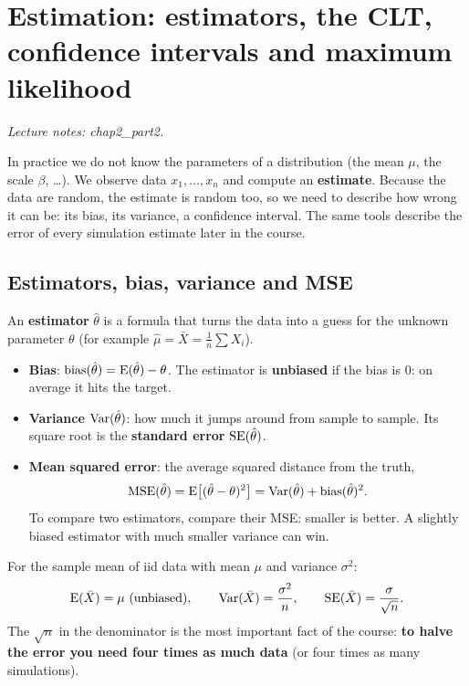 \section{Estimation: estimators, the CLT, confidence intervals and maximum likelihood}
\textit{Lecture notes: chap2\_part2.}

\begin{idea}
In practice we do not know the parameters of a distribution (the mean $\mu$, the scale $\beta$, \ldots). We observe data $x_1,\dots,x_n$ and compute an \textbf{estimate}. Because the data are random, the estimate is random too, so we need to describe how wrong it can be: its bias, its variance, a confidence interval. The same tools describe the error of every simulation estimate later in the course.
\end{idea}

\subsection{Estimators, bias, variance and MSE}
An \textbf{estimator} $\hat\theta$ is a formula that turns the data into a guess for the unknown parameter $\theta$ (for example $\hat\mu = \bar X = \frac1n\sum X_i$).
\begin{itemize}
  \item \textbf{Bias}: $\mathrm{bias}(\hat\theta) = \mathrm{E}(\hat\theta) - \theta$. The estimator is \textbf{unbiased} if the bias is 0: on average it hits the target.
  \item \textbf{Variance} $\mathrm{Var}(\hat\theta)$: how much it jumps around from sample to sample. Its square root is the \textbf{standard error} $\mathrm{SE}(\hat\theta)$.
  \item \textbf{Mean squared error}: the average squared distance from the truth,
  \[
  \mathrm{MSE}(\hat\theta) = \mathrm{E}\big[(\hat\theta-\theta)^2\big] = \mathrm{Var}(\hat\theta) + \mathrm{bias}(\hat\theta)^2 .
  \]
  To compare two estimators, compare their MSE: smaller is better. A slightly biased estimator with much smaller variance can win.
\end{itemize}
For the sample mean of iid data with mean $\mu$ and variance $\sigma^2$:
\[
\mathrm{E}(\bar X) = \mu \text{ (unbiased)}, \qquad \mathrm{Var}(\bar X) = \frac{\sigma^2}{n}, \qquad \mathrm{SE}(\bar X) = \frac{\sigma}{\sqrt n}.
\]
The $\sqrt n$ in the denominator is the most important fact of the course: \textbf{to halve the error you need four times as much data} (or four times as many simulations).

